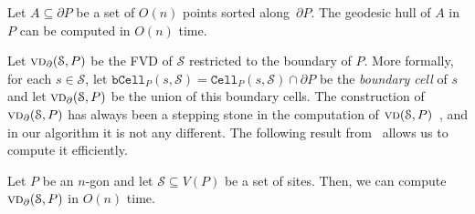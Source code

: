\documentclass[a4paper,UKenglish]{socg-lipics-v2018}
\newcommand{\s}{\mathcal S}
\newcommand{\p}[3][P]{\ensuremath{\pi_{_{#1}}(#2, #3)}}
\newcommand{\cell}[2][P]{\ensuremath{\mathtt{Cell}_{\scriptscriptstyle #1}(#2)}}
\newcommand{\bcell}[2][P]{\ensuremath{\mathtt{bCell}_{\scriptscriptstyle #1}(#2)}}
\newcommand{\vd}[2][P]{\textsc{vd}(#2, #1)}
\newcommand{\bvd}[2][P]{\textsc{vd}_{\partial}(#2, #1)}
\begin{document}
\begin{lemma}\label{lemma:Geodesic hull computation}
Let $A\subseteq \partial P$ be a set of $O(n)$ points sorted along~$\partial P$. 
The geodesic hull of $A$ in $P$ can be computed in $O(n)$ time.
\end{lemma}

%


Let $\bvd{\s}$ be the FVD of $\s$ restricted to the boundary of $P$. 
More formally, for each $s\in \s$, let $\bcell{s, \s} = \cell{s, \s}\cap \partial P$ be the \emph{boundary cell} of $s$ and let $\bvd{\s}$ be the union of this boundary cells. The construction of $\bvd{\s}$ has always been a stepping stone in the computation of $\vd{\s}$~\cite{aronov1993furthest,oh2016farthest}, and in our algorithm it is not any different. 
The following result from~\cite{oh2016farthest} allows us to compute it efficiently.

\begin{theorem}\label{thm:VD in boundary}
Let $P$ be an $n$-gon and let $\s\subseteq V(P)$ be a set of sites. 
Then, we can compute $\bvd{\s}$ in $O(n)$ time. 
\end{theorem}
\end{document}
